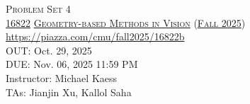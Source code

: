 \documentclass[11pt,addpoints,answers]{exam}
\title{\textsc{\hwName}} %
\author{}
\date{}
\date{}
\numberwithin{equation}{section} %
\numberwithin{figure}{section} %
\numberwithin{table}{section} %
\newcommand{\courseNum}{\href{https://geometric3d.github.io}{16822}}
\newcommand{\courseName}{\href{https://geometric3d.github.io}{Geometry-based Methods in Vision}}
\newcommand{\courseSem}{\href{https://geometric3d.github.io}{Fall 2025}}
\newcommand{\courseUrl}{\url{https://piazza.com/cmu/fall2025/16822b}}
\newcommand{\hwNum}{Problem Set 4}
\newcommand{\hwTopic}{N-view Geometry}
\newcommand{\outDate}{Oct. 29, 2025}
\newcommand{\dueDate}{Nov. 06, 2025 11:59 PM}
\newcommand{\instructorName}{Michael Kaess}
\newcommand{\taNames}{Jianjin Xu, Kallol Saha}
\begin{document}
\section*{}
\begin{center}
  \textsc{\LARGE \hwNum} \\
  \vspace{1em}
  \textsc{\large \courseNum{} \courseName{} (\courseSem)} \\
  \courseUrl\\
  \vspace{1em}
  OUT: \outDate \\
  DUE: \dueDate \\
  Instructor: \instructorName \\
  TAs: \taNames
\end{center}
\end{document}
